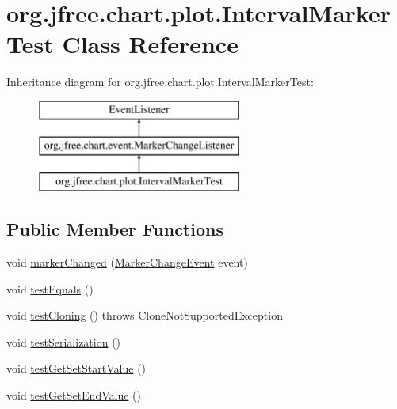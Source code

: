 \hypertarget{classorg_1_1jfree_1_1chart_1_1plot_1_1_interval_marker_test}{}\section{org.\+jfree.\+chart.\+plot.\+Interval\+Marker\+Test Class Reference}
\label{classorg_1_1jfree_1_1chart_1_1plot_1_1_interval_marker_test}
Inheritance diagram for org.\+jfree.\+chart.\+plot.\+Interval\+Marker\+Test\+:\begin{figure}[H]
\begin{center}
\leavevmode
\includegraphics[height=3.000000cm]{classorg_1_1jfree_1_1chart_1_1plot_1_1_interval_marker_test}
\end{center}
\end{figure}
\subsection*{Public Member Functions}
\begin{DoxyCompactItemize}
\item 
void \mbox{\hyperlink{classorg_1_1jfree_1_1chart_1_1plot_1_1_interval_marker_test_a04176f0b63a0fc39aa5dfcbccaed2a9b}{marker\+Changed}} (\mbox{\hyperlink{classorg_1_1jfree_1_1chart_1_1event_1_1_marker_change_event}{Marker\+Change\+Event}} event)
\item 
void \mbox{\hyperlink{classorg_1_1jfree_1_1chart_1_1plot_1_1_interval_marker_test_a5d15251c5602f3a3276bc4557548feb9}{test\+Equals}} ()
\item 
void \mbox{\hyperlink{classorg_1_1jfree_1_1chart_1_1plot_1_1_interval_marker_test_a94b2bc87c632a51d1e534039cc6b4a26}{test\+Cloning}} ()  throws Clone\+Not\+Supported\+Exception 
\item 
void \mbox{\hyperlink{classorg_1_1jfree_1_1chart_1_1plot_1_1_interval_marker_test_a23f04e81a75053ad83202e29d768b074}{test\+Serialization}} ()
\item 
void \mbox{\hyperlink{classorg_1_1jfree_1_1chart_1_1plot_1_1_interval_marker_test_a09d2cff78b28a234d38e88fd18caeb90}{test\+Get\+Set\+Start\+Value}} ()
\item 
void \mbox{\hyperlink{classorg_1_1jfree_1_1chart_1_1plot_1_1_interval_marker_test_a38f8216dc34fe55e0050697a4b71bcd4}{test\+Get\+Set\+End\+Value}} ()
\end{DoxyCompactItemize}


